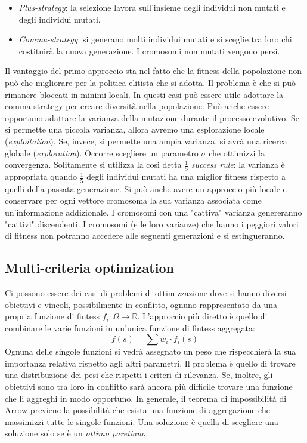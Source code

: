 \documentclass[10pt,a4paper]{article}
\begin{document}
\begin{itemize}
\item{\emph{Plus-strategy}: la selezione lavora sull'insieme degli individui non mutati e degli individui mutati. }
\item{\emph{Comma-strategy}: si generano molti individui mutati e si sceglie tra loro chi costituirà la nuova generazione. I cromosomi non mutati vengono persi.}
\end{itemize}

Il vantaggio del primo approccio sta nel fatto che la fitness della popolazione non può che migliorare per la politica elitista che si adotta. Il problema è che si può rimanere bloccati in minimi locali. In questi casi può essere utile adottare la comma-strategy per creare diversità nella popolazione. Può anche essere opportuno adattare la varianza della mutazione durante il processo evolutivo. Se si permette una piccola varianza, allora avremo una esplorazione locale (\emph{exploitation}). Se, invece, si permette una ampia varianza, si avrà una ricerca globale (\emph{exploration}). Occorre scegliere un parametro $\sigma$ che ottimizzi la convergenza. Solitamente si utilizza la così detta $\frac{1}{5}$ \emph{success rule}: la varianza è appropriata quando $\frac{1}{5}$ degli individui mutati ha una miglior fitness rispetto a quelli della passata generazione. Si può anche avere un approccio più locale e conservare per ogni vettore cromosoma la sua varianza associata come un'informazione addizionale. I cromosomi con una "cattiva" varianza genereranno "cattivi" discendenti. I cromosomi (e le loro varianze) che hanno i peggiori valori di fitness non potranno accedere alle seguenti generazioni e si estingueranno. 

\subsection{Multi-criteria optimization}

Ci possono essere dei casi di problemi di ottimizzazione dove si hanno diversi obiettivi e vincoli, possibilmente in conflitto, ognuno rappresentato da una propria funzione di fintess $f_i : \Omega \to \mathbb{R}$. L'approccio più diretto è quello di combinare le varie funzioni in un'unica funzione di fintess aggregata:
$$
f(s) = \sum w_i \cdot f_i(s)
$$
Ognuna delle singole funzioni si vedrà assegnato un peso che rispecchierà la sua importanza relativa rispetto agli altri parametri. Il problema è quello di trovare una distribuzione dei pesi che rispetti i criteri di rilevanza. Se, inoltre, gli obiettivi sono tra loro in conflitto sarà ancora più difficile trovare una funzione che li aggreghi in modo opportuno. In generale, il teorema di impossibilità di Arrow previene la possibilità che esista una funzione di aggregazione che massimizzi tutte le singole funzioni. Una soluzione è quella di scegliere una soluzione solo se è un \emph{ottimo paretiano}.
\end{document}
